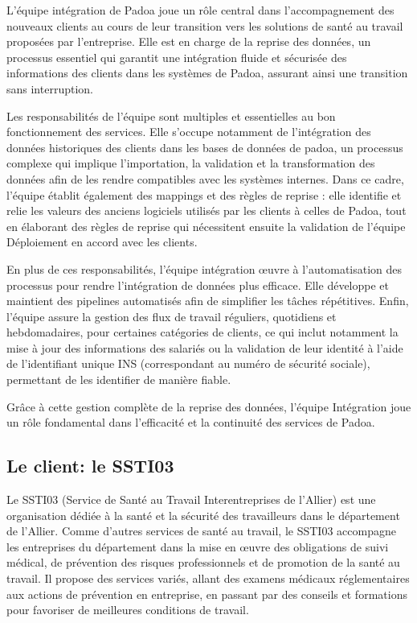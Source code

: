L’équipe intégration de Padoa joue un rôle central dans l’accompagnement des
nouveaux clients au cours de leur transition vers les solutions de santé au
travail proposées par l’entreprise. Elle est en charge de la reprise des
données, un processus essentiel qui garantit une intégration fluide et
sécurisée des informations des clients dans les systèmes de Padoa, assurant
ainsi une transition sans interruption.

Les responsabilités de l’équipe sont multiples et essentielles au bon
fonctionnement des services. Elle s’occupe notamment de l’intégration des
données historiques des clients dans les bases de données de padoa, un
processus complexe qui implique l’importation, la validation et la
transformation des données afin de les rendre compatibles avec les systèmes
internes. Dans ce cadre, l’équipe établit également des mappings et des règles
de reprise : elle identifie et relie les valeurs des anciens logiciels utilisés
par les clients à celles de Padoa, tout en élaborant des règles de reprise qui
nécessitent ensuite la validation de l’équipe Déploiement en accord avec les
clients.

En plus de ces responsabilités, l’équipe intégration œuvre à l’automatisation
des processus pour rendre l’intégration de données plus efficace. Elle
développe et maintient des pipelines automatisés afin de simplifier les tâches
répétitives. Enfin, l’équipe assure la gestion des flux de travail
réguliers, quotidiens et hebdomadaires, pour certaines catégories de clients,
ce qui inclut notamment la mise à jour des informations des salariés ou la
validation de leur identité à l’aide de l’identifiant unique INS (correspondant
au numéro de sécurité sociale), permettant de les identifier de manière fiable.

Grâce à cette gestion complète de la reprise des données, l’équipe Intégration
joue un rôle fondamental dans l’efficacité et la continuité des services de
Padoa.

\subsection{Le client: le SSTI03}

Le SSTI03 (Service de Santé au Travail Interentreprises de l’Allier) est une organisation dédiée à la santé et la sécurité des travailleurs dans le département de l’Allier. Comme d'autres services de santé au travail, le SSTI03 accompagne les entreprises du département dans la mise en œuvre des obligations de suivi médical, de prévention des risques professionnels et de promotion de la santé au travail. Il propose des services variés, allant des examens médicaux réglementaires aux actions de prévention en entreprise, en passant par des conseils et formations pour favoriser de meilleures conditions de travail.

